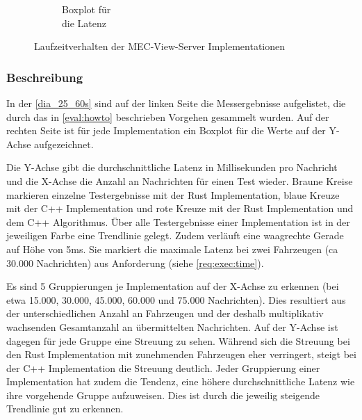 {\begin{figure}[H]
\begin{subfigure}{.35\textwidth}
			\caption{Boxplot für\\die Latenz}
			\label{#1_boxplot}
		\end{subfigure}
		\caption{Laufzeitverhalten der MEC-View-Server Implementationen}
		\label{dia_#1}
	\end{figure}
}


\subsubsection{Beschreibung}
In der \autoref{dia_25_60s} sind auf der linken Seite die Messergebnisse aufgelistet, die durch das in \autoref{eval:howto} beschrieben Vorgehen gesammelt wurden.
Auf der rechten Seite ist für jede Implementation ein Boxplot für die Werte auf der Y-Achse aufgezeichnet.

Die Y-Achse gibt die durchschnittliche Latenz in Millisekunden pro Nachricht und die X-Achse die Anzahl an Nachrichten für einen Test wieder.
Braune Kreise markieren einzelne Testergebnisse mit der Rust Implementation, blaue Kreuze mit der C++ Implementation und rote Kreuze mit der Rust Implementation und dem C++ Algorithmus.
Über alle Testergebnisse einer Implementation ist in der jeweiligen Farbe eine Trendlinie gelegt.
Zudem verläuft eine waagrechte Gerade auf Höhe von 5ms. Sie markiert die maximale Latenz bei zwei Fahrzeugen (ca 30.000 Nachrichten) aus Anforderung  (siehe \autoref{req:exec:time}).

Es sind 5 Gruppierungen je Implementation auf der X-Achse zu erkennen (bei etwa 15.000, 30.000, 45.000, 60.000 und 75.000 Nachrichten).
Dies resultiert aus der unterschiedlichen Anzahl an Fahrzeugen und der deshalb multiplikativ wachsenden Gesamtanzahl an übermittelten Nachrichten.
Auf der Y-Achse ist dagegen für jede Gruppe eine Streuung zu sehen.
Während sich die Streuung bei den Rust Implementation mit zunehmenden Fahrzeugen eher verringert, steigt bei der C++ Implementation die Streuung deutlich.
Jeder Gruppierung einer Implementation hat zudem die Tendenz, eine höhere durchschnittliche Latenz wie ihre vorgehende Gruppe aufzuweisen.
Dies ist durch die jeweilig steigende Trendlinie gut zu erkennen.

